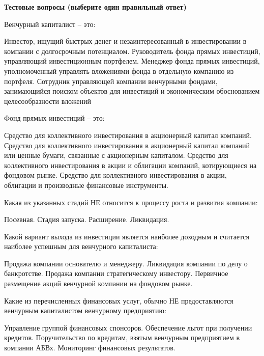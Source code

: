 \documentclass[12pt, table]{exam}
\begin{document}
\pagebreak
\noindent\textbf{Тестовые вопросы (выберите один правильный ответ)}

\begin{questions}

\begin{multicols}{2}

\question Венчурный капиталист – это:
\begin{choices}
	\choice Инвестор, ищущий быстрых денег и незаинтересованный в инвестировании в компании с долгосрочным потенциалом.
	\CC Руководитель фонда прямых инвестиций, управляющий инвестиционным портфелем.
	\choice Менеджер фонда прямых инвестиций, уполномоченный управлять вложениями фонда в отдельную компанию из портфеля.
	\choice Сотрудник управляющей компании венчурными фондами, занимающийся поиском объектов для инвестиций и экономическим обоснованием целесообразности вложений
\end{choices}

\question Фонд прямых инвестиций – это:
\begin{choices}
	\choice Средство для коллективного инвестирования в акционерный капитал компаний.
	\CC Средство для коллективного инвестирования в акционерный капитал компаний или ценные бумаги, связанные с акционерным капиталом.
	\choice Средство для коллективного инвестирования в акции и облигации компаний, котирующиеся на фондовом рынке.
	\choice Средство для коллективного инвестирования в акции, облигации и производные финансовые инструменты.
\end{choices}

\question Какая из указанных стадий НЕ относится к процессу роста и развития компании:
\begin{choices}
	\choice Посевная.
	\choice Стадия запуска.
	\choice Расширение.
	\CC Ликвидация.
\end{choices}

\question Какой вариант выхода из инвестиции является наиболее доходным и считается наиболее успешным для венчурного капиталиста:
\begin{choices}
	\choice Продажа компании основателю и менеджеру.
	\choice Ликвидация компании по делу о банкротстве.
	\choice Продажа компании стратегическому инвестору.
	\CC Первичное размещение акций венчурной компании на фондовом рынке. 
\end{choices}

\question Какие из перечисленных финансовых услуг, обычно НЕ предоставляются венчурным капиталистом венчурному предприятию:
\begin{choices}
	\choice Управление группой финансовых спонсоров.
	\CC Обеспечение льгот при получении кредитов.
	\choice Поручительство по кредитам, взятым венчурным предприятием в компании АБВх.
	\choice Мониторинг финансовых результатов.
\end{choices}


\end{multicols}
\end{questions}
\end{document}

